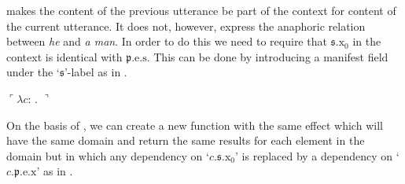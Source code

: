 \preveg{} makes the content of the previous utterance be part of the
context for content of the current utterance.  It does not, however,
express the anaphoric relation between \textit{he} and \textit{a man}.
In order to do this we need to require that $\mathfrak{s}.\text{x}_0$
in the context is identical with $\mathfrak{p}.\text{e}.\text{s}$.
This can be done by introducing a manifest field under the
`$\mathfrak{s}$'-label as in \nexteg{}.
\begin{ex} 
  $\ulcorner\lambda c$:
  . $\urcorner$
\end{ex}
On the basis of \preveg{}, we can create a new function with the same
effect which will have the same domain and return the same results for
each element in the domain but in which any dependency on
`$c.\mathfrak{s}.\text{x}_0$' is replaced by a dependency on
`$c.\mathfrak{p}.\text{e}.\text{x}$' as in \nexteg{}.
